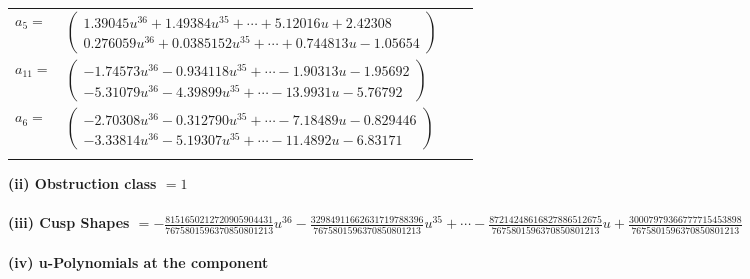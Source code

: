 \documentclass[1p]{elsarticle_modified}
\theoremstyle{definition}
\begin{document}
\begin{tabular}{m{7pt} m{180pt} m{7pt} m{180pt} }
\flushright $a_{5}=$&$\begin{pmatrix}1.39045 u^{36}+1.49384 u^{35}+\cdots+5.12016 u+2.42308\\0.276059 u^{36}+0.0385152 u^{35}+\cdots+0.744813 u-1.05654\end{pmatrix}$ \\
\flushright $a_{11}=$&$\begin{pmatrix}-1.74573 u^{36}-0.934118 u^{35}+\cdots-1.90313 u-1.95692\\-5.31079 u^{36}-4.39899 u^{35}+\cdots-13.9931 u-5.76792\end{pmatrix}$ \\
\flushright $a_{6}=$&$\begin{pmatrix}-2.70308 u^{36}-0.312790 u^{35}+\cdots-7.18489 u-0.829446\\-3.33814 u^{36}-5.19307 u^{35}+\cdots-11.4892 u-6.83171\end{pmatrix}$\\&\end{tabular}
\flushleft \textbf{(ii) Obstruction class $= 1$}\\~\\
\flushleft \textbf{(iii) Cusp Shapes $= -\frac{8151650212720905904431}{7675801596370850801213} u^{36}-\frac{32984911662631719788396}{7675801596370850801213} u^{35}+\cdots-\frac{87214248616827886512675}{7675801596370850801213} u+\frac{30007979366777715453898}{7675801596370850801213}$}\\~\\
\newpage\renewcommand{\arraystretch}{1}
\flushleft \textbf{(iv) u-Polynomials at the component}\newline \\
\end{document}

